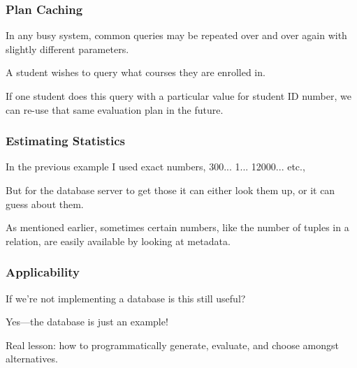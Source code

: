 \begin{frame}
\frametitle{Plan Caching}

In any busy system, common queries may be repeated over and over again with slightly different parameters. 

A student wishes to query what courses they are enrolled in. 

If one student does this query with a particular value for student ID number, we can re-use that same evaluation plan in the future.

\end{frame}


\begin{frame}
\frametitle{Estimating Statistics}

In the previous example I used exact numbers, 300... 1... 12000... etc.,

But for the database server to get those it can either look them up, or it can guess about them. 

As mentioned earlier, sometimes certain numbers, like the number of tuples in a relation, are easily available by looking at metadata. 

\end{frame}


\begin{frame}
\frametitle{Applicability}

If we're not implementing a database is this still useful?

Yes---the database is just an example!

Real lesson: how to programmatically generate, evaluate, and choose amongst alternatives.

\end{frame}




